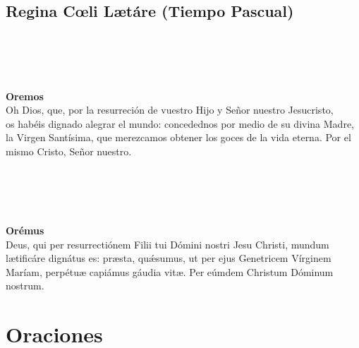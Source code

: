 \documentclass[10pt,a4paper,oneside]{book}
\begin{document}
\section*{Regina C{\oe}li L{\ae}táre (Tiempo Pascual)}

\begin{minipage}[t]{0.475\textwidth}
    \\
    \\
    \\\\
    \textbf{Oremos}\\
    Oh Dios, que, por la resurreción de vuestro Hijo y Señor nuestro Jesucristo,\\
    os habéis dignado alegrar el mundo: concedednos por medio de su divina Madre, la Virgen Santísima,
    que merezcamos obtener los goces de la vida eterna. Por el mismo Cristo, Señor nuestro.  
\end{minipage}
\begin{minipage}[t]{0.475\textwidth}
    \\
    \\
    \\\\
    \textbf{Orémus}\\
    Deus, qui per resurrectiónem Filii tui Dómini nostri Jesu Christi,
    mundum l{\ae}tificáre dignátus es: pr{\ae}sta, qu{\'\ae}sumus, ut per ejus Genetricem Vírginem Maríam,
    perpétu{\ae} capiámus gáudia vit{\ae}. Per eúmdem Christum Dóminum nostrum. 
\end{minipage}
\chapter*{Oraciones}
\end{document}
